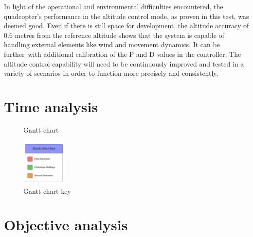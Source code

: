 \documentclass{article}
\begin{document}
In light of the operational and environmental difficulties encountered, the quadcopter's performance in the altitude control mode, as proven in this test, was deemed good. Even if there is still space for development, the altitude accuracy of 0.6 metres from the reference altitude shows that the system is capable of handling external elements 
like wind and movement dynamics. It can be further with additional calibration of the P and D values in the controller. The altitude control capability will need to be continuously improved and tested in a variety of scenarios in order to function more precisely and consistently.
\section{Time analysis}
\begin{figure}[H]
  \centering
  \caption{Gantt chart}
  \label{fig:gantt_chart}
\end{figure}
\begin{figure}[H]
  \centering
  \includegraphics[width=0.2\textwidth]{Pictures/Gantt_chart_key.png}
  \caption{Gantt chart key}
  \label{fig:gantt_chart_key}
\end{figure}
\section{Objective analysis}


\end{document}
